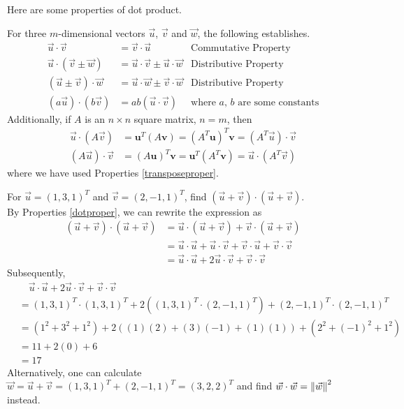 Here are some properties of dot product.
\begin{proper}
\label{dotproper}
For three $m$-dimensional vectors $\vec{u}$, $\vec{v}$ and $\vec{w}$, the following establishes.
\begin{align*}
\vec{u} \cdot \vec{v} &= \vec{v} \cdot \vec{u} &\text{Commutative Property} \\
\vec{u} \cdot (\vec{v} \pm \vec{w}) &= \vec{u} \cdot \vec{v} \pm \vec{u} \cdot \vec{w} &\text{Distributive Property} \\
(\vec{u} \pm \vec{v}) \cdot \vec{w} &= \vec{u} \cdot \vec{w} \pm \vec{v} \cdot \vec{w} &\text{Distributive Property} \\
(a\vec{u}) \cdot (b\vec{v}) &= ab(\vec{u} \cdot \vec{v}) &\text{where $a$, $b$ are some constants}
\end{align*}
Additionally, if $A$ is an $n \times n$ square matrix, $n = m$, then
\begin{align*}
\vec{u} \cdot (A\vec{v}) &= \textbf{u}^T(A\textbf{v}) = (A^T\textbf{u})^T\textbf{v} = (A^T\vec{u}) \cdot \vec{v} \\
(A\vec{u}) \cdot \vec{v} &= (A\textbf{u})^T\textbf{v} = \textbf{u}^T(A^T\textbf{v}) = \vec{u} \cdot (A^T\vec{v})
\end{align*}
where we have used Properties \ref{transposeproper}.
\end{proper}
\begin{exmp}
For $\vec{u} = (1,3,1)^T$ and $\vec{v} = (2,-1,1)^T$, find $(\vec{u} + \vec{v}) \cdot (\vec{u} + \vec{v})$.
\\
By Properties \ref{dotproper}, we can rewrite the expression as
\begin{align*}
(\vec{u} + \vec{v}) \cdot (\vec{u} + \vec{v}) &= \vec{u} \cdot (\vec{u} + \vec{v}) + \vec{v} \cdot (\vec{u} + \vec{v}) \\
&= \vec{u} \cdot \vec{u} + \vec{u} \cdot \vec{v} + \vec{v} \cdot \vec{u} + \vec{v} \cdot \vec{v} \\
&= \vec{u} \cdot \vec{u} + 2 \vec{u} \cdot \vec{v} + \vec{v} \cdot \vec{v}
\end{align*}
Subsequently,
\begin{align*}
&\quad \vec{u} \cdot \vec{u} + 2 \vec{u} \cdot \vec{v} + \vec{v} \cdot \vec{v} \\
&= (1,3,1)^T \cdot (1,3,1)^T + 2((1,3,1)^T \cdot (2,-1,1)^T) + (2,-1,1)^T \cdot (2,-1,1)^T \\
&= (1^2 + 3^2 + 1^2) + 2((1)(2)+(3)(-1)+(1)(1)) + (2^2 + (-1)^2 + 1^2) \\
&= 11 + 2(0) + 6 \\
&= 17
\end{align*}
Alternatively, one can calculate $\vec{w} = \vec{u} + \vec{v} = (1,3,1)^T + (2,-1,1)^T = (3,2,2)^T$ and find $\vec{w} \cdot \vec{w} = \norm{\vec{w}}^2$ instead.
\end{exmp}
